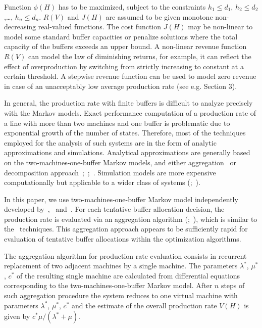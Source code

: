 \documentclass{ifacconf}
\begin{document}
Function $\phi(H)$ has to be maximized, subject to the constraints $h_1 \leq d_1$, $h_2 \leq d_2$,…, $h_n \leq d_n$.
$R(V)$ and $J(H)$ are assumed to be given monotone non-decreasing real-valued functions. 
The cost function $J(H)$ may be non-linear to model some standard buffer capacities or 
penalize  solutions  where  the  total  capacity  of  the  buffers  exceeds  an  upper  bound. A 
non-linear revenue function $R(V)$ can model the law of diminishing returns, for example, 
it  can  reflect  the  effect  of  overproduction  by  switching  from  strictly  increasing  to 
constant at a certain threshold. A stepwise revenue function can be used to model zero 
revenue  in  case  of  an  unacceptably  low  average  production  rate  (see  e.g.  Section  3). 

In general, the production rate with finite buffers is difficult to analyze precisely with 
the Markov models. Exact performance computation of a production rate of a line with 
more than two machines and one buffer is problematic due to exponential growth of the 
number of states. Therefore, most of the techniques employed for the analysis of such 
systems are in the form of analytic approximations and simulations. Analytical 
approximations are generally based on the two-machines-one-buffer Markov models, 
and either aggregation~\cite{DeKoster87} or decomposition approach~\cite{DalXie89};~\cite{Gers87};~\cite{Li2005}. Simulation models are more expensive 
computationally but applicable to a wider class of systems (\cite{DS95};~\cite{SorJan2004}). 
 




In this paper, we use two-machines-one-buffer Markov model independently developed 
by~\cite{LP},~\cite{DF} and~\cite{Proth84}. For 
each tentative buffer allocation decision, the production rate is evaluated via an 
aggregation algorithm (\cite{Dolgui93};~\cite{DS95}), which is similar to the~\cite{TD87} techniques. 
This aggregation approach appears to be 
sufficiently rapid for evaluation of tentative buffer allocations within the optimization 
algorithms.  
 
The aggregation algorithm for production rate evaluation consists in recurrent 
replacement of two adjacent machines by a single machine. The parameters $\lambda^*$, $\mu^*$, $c^*$ of 
the resulting single machine are calculated from differential equations corresponding to
the two-machines-one-buffer Markov model. After $n$ steps of such aggregation 
procedure the system reduces to one virtual machine with parameters $\lambda^*$, $\mu^*$, $c^*$ and the 
estimate of the overall production rate $V(H)$ is given by $c^*\mu/(\lambda^*+\mu).$
\end{document}

